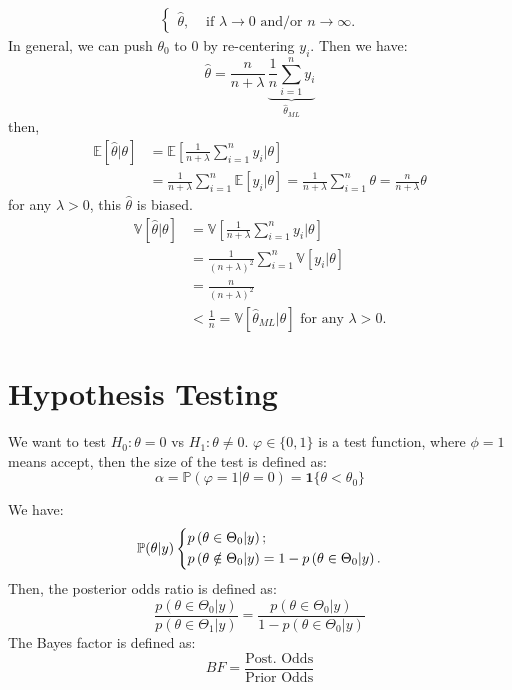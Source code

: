 \begin{eg}
\begin{align}
\begin{cases}
            \hat{\theta }, &\text{ if } \lambda \to 0 \text{ and/or } n \to \infty .
        \end{cases}
    \end{align}
    In general, we can push $\theta _0$ to $0$ by re-centering $y_i$.
    Then we have:
    \begin{equation}
        \hat{\theta } = \frac{n}{n + \lambda }\, \underset{ \hat{\theta }_{ML} }{ \underbrace{ \frac{1}{n} \sum_{i=1}^n y_i }}
    \end{equation}
    then,
    \begin{align}
        \mathbb{E}[\hat{\theta } | \theta ] &= \mathbb{E}\left[ \frac{1}{n + \lambda} \sum_{i=1}^n y_i | \theta \right] \\
        &= \frac{1}{n + \lambda} \sum_{i=1}^n \mathbb{E}[y_i | \theta ] = \frac{1}{n + \lambda} \sum_{i=1}^n \theta = \frac{n}{n + \lambda} \theta 
    \end{align}
    for any $\lambda > 0$, this $\hat{\theta }$ is biased.
    \begin{align}
        \mathbb{V}[\hat{\theta } | \theta ] &= \mathbb{V}\left[ \frac{1}{n + \lambda} \sum_{i=1}^n y_i | \theta \right] \\
        &= \frac{1}{(n + \lambda)^2} \sum_{i=1}^n \mathbb{V}[y_i | \theta ] \\
        &= \frac{n}{(n + \lambda)^2} \\
        &< \frac{1}{n} = \mathbb{V}[\hat{\theta }_{ML} | \theta ] \text{ for any } \lambda > 0.
    \end{align}
\end{eg}

\section{Hypothesis Testing}

We want to test $H_0: \theta = 0$ vs $H_1: \theta \neq 0$.
$\varphi \in \{0, 1\}$ is a test function, where $\phi = 1$ means accept,
then the size of the test is defined as:
\begin{equation}
    \alpha = \mathbb{P}(\varphi = 1 | \theta = 0) = \mathbf{1} \{\theta < \theta_0 \}
\end{equation}

We have:
\begin{align}
    \mathbb{P}(\theta | y) \begin{dcases}
        p\left( \theta \in \Theta_0 | y \right);\\
        p\left( \theta \notin \Theta_0 | y \right) = 1 - p\left( \theta \in \Theta_0 | y \right).
    \end{dcases}
\end{align}
Then, the posterior odds ratio is defined as:
\begin{equation}
    \frac{p\left( \theta \in \Theta_0 | y \right)}{p\left( \theta \in \Theta_1 | y \right)} = \frac{p\left( \theta \in \Theta_0 | y \right)}{1 - p\left( \theta \in \Theta_0 | y \right)}
\end{equation}
The Bayes factor is defined as:
\begin{equation}
    BF = \frac{\text{Post. Odds}}{\text{Prior Odds}}
\end{equation}

